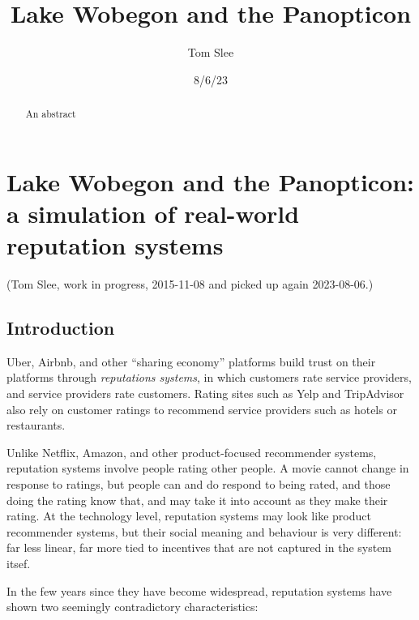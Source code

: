 \documentclass[
  letterpaper,
  DIV=11,
  numbers=noendperiod]{scrartcl}
\title{Lake Wobegon and the Panopticon}
\author{Tom Slee}
\date{8/6/23}
\begin{document}
\maketitle
\begin{abstract}
An abstract
\end{abstract}
\ifdefined\Shaded\renewenvironment{Shaded}{\begin{tcolorbox}[boxrule=0pt, frame hidden, enhanced, borderline west={3pt}{0pt}{shadecolor}, breakable, sharp corners, interior hidden]}{\end{tcolorbox}}\fi

\hypertarget{lake-wobegon-and-the-panopticon-a-simulation-of-real-world-reputation-systems}{%
\section{Lake Wobegon and the Panopticon: a simulation of real-world
reputation
systems}\label{lake-wobegon-and-the-panopticon-a-simulation-of-real-world-reputation-systems}}

(Tom Slee, work in progress, 2015-11-08 and picked up again 2023-08-06.)

\hypertarget{introduction}{%
\subsection{Introduction}\label{introduction}}

Uber, Airbnb, and other ``sharing economy'' platforms build trust on
their platforms through \emph{reputations systems}, in which customers
rate service providers, and service providers rate customers. Rating
sites such as Yelp and TripAdvisor also rely on customer ratings to
recommend service providers such as hotels or restaurants.

Unlike Netflix, Amazon, and other product-focused recommender systems,
reputation systems involve people rating other people. A movie cannot
change in response to ratings, but people can and do respond to being
rated, and those doing the rating know that, and may take it into
account as they make their rating. At the technology level, reputation
systems may look like product recommender systems, but their social
meaning and behaviour is very different: far less linear, far more tied
to incentives that are not captured in the system itsef.

In the few years since they have become widespread, reputation systems
have shown two seemingly contradictory characteristics:
\end{document}
